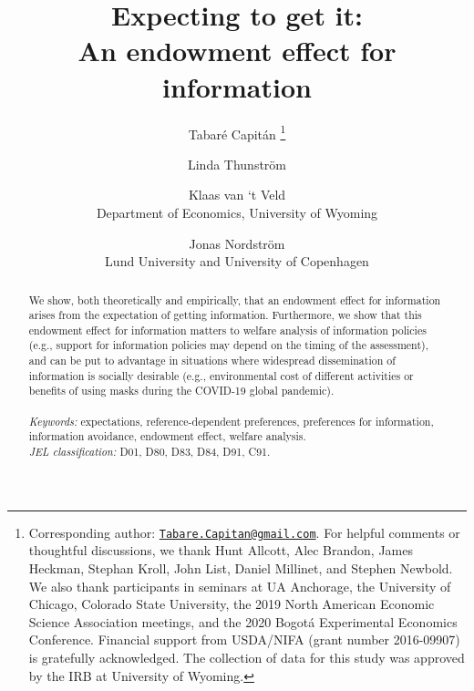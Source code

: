 
\title{\vspace{-3cm}
      Expecting to get it: \\ An endowment effect for information
      }


\author{Tabaré Capitán
          \thanks{Corresponding author: \href{mailto:Tabare.Capitan@gmail.com}{\texttt{Tabare.Capitan@gmail.com}}. For helpful comments or thoughtful discussions, we thank Hunt Allcott, Alec Brandon, James Heckman, Stephan Kroll, John List, Daniel Millinet, and Stephen Newbold. We also thank participants in seminars at UA Anchorage, the University of Chicago, Colorado State University, the 2019 North American Economic Science Association meetings, and the 2020 Bogotá Experimental Economics Conference. Financial support from USDA/NIFA (grant number 2016-09907) is gratefully acknowledged. The collection of data for this study was approved by the IRB at University of Wyoming.}
        \and
        Linda Thunström
        \and
        Klaas van ‘t Veld
          \\ \small{Department of Economics, University of Wyoming}
        \and
        Jonas Nordström
          \\ \small{Lund University and University of Copenhagen}
        }

\maketitle

\thispagestyle{empty}   %

\begin{abstract}

\noindent
We show, both theoretically and empirically, that an endowment effect for information arises from the expectation of getting information. Furthermore, we show that this endowment effect for information matters to welfare analysis of information policies (e.g., support for information policies may depend on the timing of the assessment), and can be put to advantage in situations where widespread dissemination of information is socially desirable (e.g., environmental cost of different activities or benefits of using masks during the COVID-19 global pandemic).
\\
\\
\textit{Keywords:} expectations, reference-dependent preferences, preferences for information, information avoidance, endowment effect, welfare analysis.
\\
\textit{JEL classification:} D01, D80, D83, D84, D91, C91.

\end{abstract}

\clearpage

